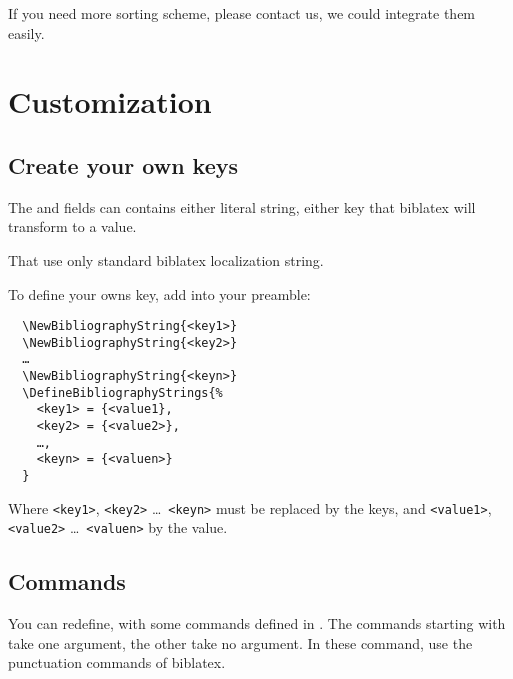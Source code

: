 \documentclass{ltxdockit}[2011/03/25]
\newcommand{\biblatex}{biblatex\xspace}
\newcommand{\meta}[1]{\texttt{<#1>}}
\begin{document}
If you need more sorting scheme, please contact us, we could integrate them easily.
 
\section{Customization}

\subsection{Create your own keys}\label{key-definition}

The  and  fields can contains either literal string, either key that \biblatex will transform to a value.

That use only standard \biblatex  localization string.
 
To define your owns key, add into your preamble:
\begin{verbatim}
  \NewBibliographyString{<key1>}
  \NewBibliographyString{<key2>}
  …
  \NewBibliographyString{<keyn>}
  \DefineBibliographyStrings{%
    <key1> = {<value1},
    <key2> = {<value2>},
    …,
    <keyn> = {<valuen>}
  }

\end{verbatim}
 
Where \meta{key1}, \meta{key2} \ldots\ \meta{keyn} must be replaced by the keys, and \meta{value1}, \meta{value2} \ldots\ \meta{valuen} by the value.
 

\subsection{Commands}

You can redefine, with  some commands defined in . The commands starting with  take one argument, the other take no argument. In these command, use the punctuation commands of \biblatex.
\end{document}

